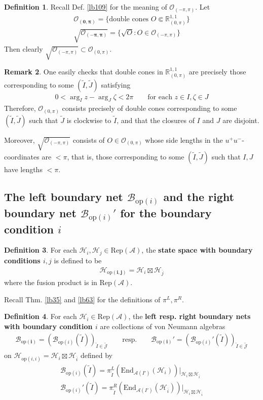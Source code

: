 \documentclass[11pt,b5paper,notitlepage]{article}
\theoremstyle{definition}
\newtheorem{df}{Definition}[section]
\newtheorem{rem}[df]{Remark}
\theoremstyle{plain}
\newcommand{\wtd}{\widetilde}
\newcommand{\ovl}{\overline}
\newcommand{\End}{\mathrm{End}} %
\newcommand{\Jtd}{\widetilde{\mathcal J}}
\newcommand{\RepA}{\mathrm{Rep}(\mathcal A)}
\newcommand{\MA}{\mathcal A}
\newcommand{\MH}{\mathcal H}
\newcommand{\Rzp}{\mathbb R^{1,1}_{(0,\pi)}}
\newcommand{\Opp}{\mathcal O_{(-\pi,\pi)}}
\newcommand{\Ozp}{\mathcal O_{(0,\pi)}}
\newcommand{\ZOpp}{\sqrt{\mathcal O_{(-\pi,\pi)}}}
\newcommand{\Bopi}{\mathcal B_{\mathrm{op}(i)}}
\newcommand{\Hopij}{\mathcal H_{\mathrm{op}(i,j)}}
\newcommand{\Hopii}{\mathcal H_{\mathrm{op}(i,i)}}
\newcommand{\hqed}{\hfill\qedsymbol}
\numberwithin{equation}{section}
\begin{document}
\begin{df}
Recall Def. \ref{lb109} for the meaning of $\Opp$. Let
\begin{gather*}
\pmb{\Ozp}=\{\text{double cones }O\Subset\Rzp\}\\
\pmb{\ZOpp}=\{\sqrt O:O\in\Opp\}
\end{gather*}
Then clearly $\ZOpp\subset\Ozp$.
\end{df}


\begin{rem}\label{lb79}
One easily checks that double cones in $\Rzp$ are precisely those corresponding to some $(\wtd I,\wtd J)$ satisfying
\begin{align*}
0<\arg_I z-\arg_J\zeta<2\pi\qquad\text{for each }z\in I,\zeta\in J
\end{align*}
Therefore, $\Ozp$ consists precisely of double cones corresponding to some $(\wtd I,\wtd J)$ such that $\wtd J$ is clockwise to $\wtd I$, and that the closures of $I$ and $J$ are disjoint.

Moreover, $\ZOpp$ consists of $O\in\Ozp$ whose side lengths in the $u^+u^-$-coordinates are $<\pi$, that is, those corresponding to some $(\wtd I,\wtd J)$ such that $I,J$ have lengths $<\pi$. \hqed
\end{rem}




\subsection{The left boundary net $\Bopi$ and the right boundary net $\Bopi'$ for the boundary condition $i$}\label{lb131}






\begin{df}\label{lb116}
For each $\MH_i,\MH_j\in\RepA$, the \textbf{state space with boundary conditions $i,j$} is defined to be
\begin{align*}
\pmb{\Hopij}=\MH_i\boxtimes\MH_{\ovl j}
\end{align*}
where the fusion product is in $\RepA$.
\end{df}

Recall Thm. \ref{lb35} and \ref{lb63} for the definitions of $\pi^L,\pi^R$.

\begin{df}\label{lb112}
For each $\MH_i\in\RepA$, the \textbf{left resp. right boundary nets with boundary condition $i$} are collections of von Neumann algebras
\begin{gather}
\pmb{\Bopi}=(\Bopi(\wtd I))_{\wtd I\in\Jtd}\qquad\text{resp.}\qquad \pmb{\Bopi'}=(\Bopi'(\wtd I))_{\wtd I\in\Jtd}
\end{gather}
on $\Hopii=\MH_i\boxtimes\MH_{\ovl i}$ defined by
\begin{subequations}\label{eq52}
\begin{gather}
\Bopi(\wtd I)=\pi^L_{\wtd I}(\End_{\MA(I')}(\MH_i))\big|_{\MH_i\boxtimes\MH_{\ovl i}}\\
\Bopi'(\wtd I)=\pi^R_{\wtd I}(\End_{\MA(I')}(\MH_{\ovl i}))\big|_{\MH_i\boxtimes\MH_{\ovl i}}
\end{gather}
\end{subequations}
\end{df}
\end{document}
